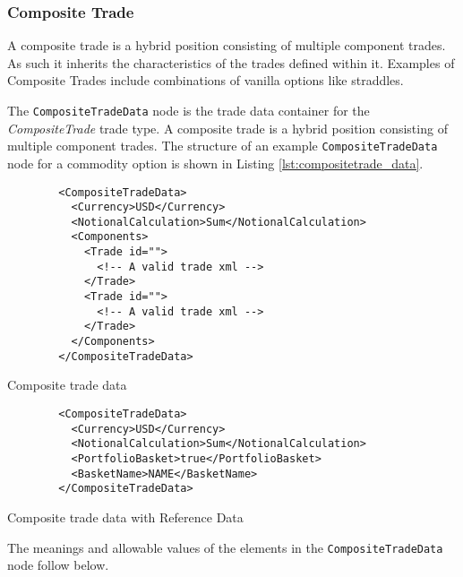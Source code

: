\subsubsection{Composite Trade}

A composite trade is a hybrid position consisting of multiple component trades. As such it inherits the characteristics of the trades defined within it. Examples of Composite Trades include combinations of vanilla options like straddles.

The \lstinline!CompositeTradeData!  node is the trade data container for the  \emph{CompositeTrade} trade type.   A composite trade is a hybrid position consisting of multiple component trades. The structure of an example \lstinline!CompositeTradeData! node for a commodity option is shown in 
Listing \ref{lst:compositetrade_data}.

\begin{listing}[H]
	\begin{verbatim}
		<CompositeTradeData>
		  <Currency>USD</Currency>
		  <NotionalCalculation>Sum</NotionalCalculation>
		  <Components>
		    <Trade id="">
		      <!-- A valid trade xml -->
		    </Trade>
		    <Trade id="">
		      <!-- A valid trade xml -->
		    </Trade>
		  </Components>
		</CompositeTradeData>
	\end{verbatim}
	\caption{Composite trade data}
	\label{lst:compositetrade_data}
\end{listing}

\begin{listing}[H]
	\begin{verbatim}
		<CompositeTradeData>
		  <Currency>USD</Currency>
		  <NotionalCalculation>Sum</NotionalCalculation>
		  <PortfolioBasket>true</PortfolioBasket>
		  <BasketName>NAME</BasketName>
		</CompositeTradeData>
	\end{verbatim}
	\caption{Composite trade data with Reference Data}
\end{listing}

The meanings and allowable values of the elements in the \lstinline!CompositeTradeData!  node follow below.

